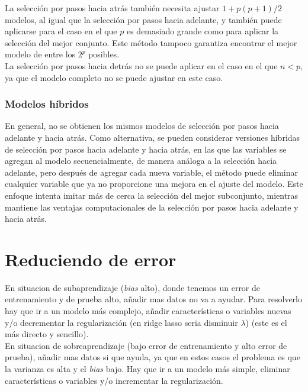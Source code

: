 La selección por pasos hacia atrás también necesita ajustar $1 + p(p+1)/2$ modelos, al igual que la selección por pasos hacia adelante, y también puede aplicarse para el caso en el que $p$ es demasiado grande como para aplicar la selección del mejor conjunto. Este método tampoco garantiza encontrar el mejor modelo de entre los $2^p$ posibles. \\

La selección por pasos hacia detrás no se puede aplicar en el caso en el que $n < p$, ya que el modelo completo no se puede ajustar en este caso.

\subsubsection{Modelos híbridos}

En general, no se obtienen los mismos modelos de selección por pasos hacia adelante y hacia atrás. Como alternativa, se pueden considerar versiones híbridas de selección por pasos hacia adelante y hacia atrás, en las que las variables se agregan al modelo secuencialmente, de manera análoga a la selección hacia adelante, pero después de agregar cada nueva variable, el método puede eliminar cualquier variable que ya no proporcione una mejora en el ajuste del modelo. Este enfoque intenta imitar más de cerca la selección del mejor subconjunto, mientras mantiene las ventajas computacionales de la selección por pasos hacia adelante y hacia atrás.

\section{Reduciendo de error}

En situacion de subaprendizaje (\textit{bias} alto), donde tenemos un error de entrenamiento y de prueba alto, añadir mas datos no va a ayudar. Para resolverlo hay que ir a un modelo más complejo, añadir características o variables nuevas y/o decrementar la regularización (en ridge lasso seria disminuir $\lambda$) (este es el más directo y sencillo). \\

En situacion de sobreaprendizaje (bajo error de entrenamiento y alto error de prueba), añadir mas datos si que ayuda, ya que en estos casos el problema es que la varianza es alta y el \textit{bias} bajo. Hay que ir a un modelo más simple, eliminar características o variables y/o incrementar la regularización.


